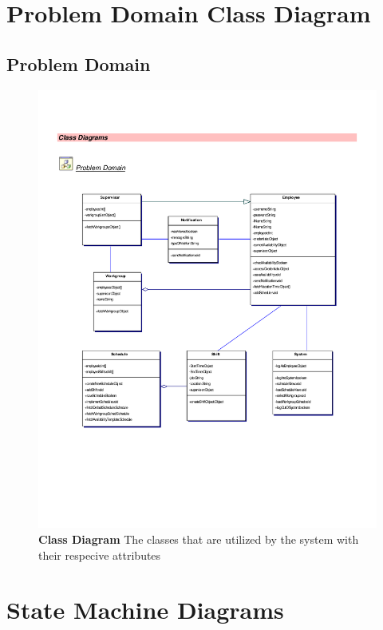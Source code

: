 \documentclass[letterpaper,12pt]{report}
\begin{document}



\chapter{Problem Domain Class Diagram}
\section{Problem  Domain}
\newpage
\begin{figure}[hbp]
 \includegraphics[scale=0.9,trim=10mm 60mm 25mm 20mm]{diagrams/cd_problem.pdf}
 \caption{\small
\textbf{Class Diagram} \space \newline The classes that are utilized by the system with their respecive attributes}\label{fig:problemDomain}
\end{figure}
\newpage
\clearpage
\chapter{State Machine Diagrams}
\end{document}
